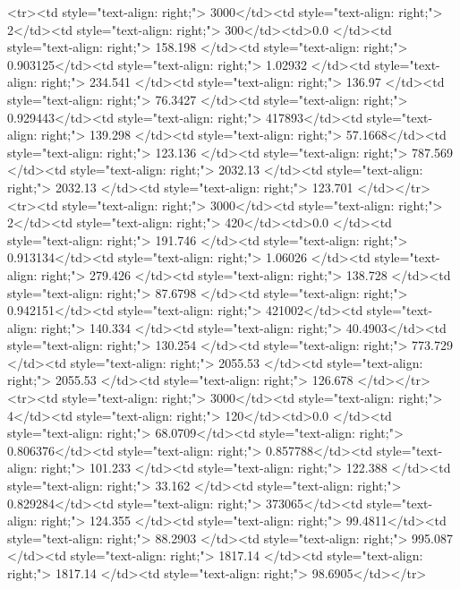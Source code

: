 <tr><td style="text-align: right;">      3000</td><td style="text-align: right;">         2</td><td style="text-align: right;">           300</td><td>0.0          </td><td style="text-align: right;">               158.198 </td><td style="text-align: right;">           0.903125</td><td style="text-align: right;">         1.02932 </td><td style="text-align: right;">        234.541 </td><td style="text-align: right;">           136.97  </td><td style="text-align: right;">              76.3427  </td><td style="text-align: right;">             0.929443</td><td style="text-align: right;">              417893</td><td style="text-align: right;">                      139.298 </td><td style="text-align: right;">            57.1668</td><td style="text-align: right;">               123.136  </td><td style="text-align: right;">       787.569 </td><td style="text-align: right;">   2032.13 </td><td style="text-align: right;">      2032.13 </td><td style="text-align: right;">                123.701 </td></tr>
<tr><td style="text-align: right;">      3000</td><td style="text-align: right;">         2</td><td style="text-align: right;">           420</td><td>0.0          </td><td style="text-align: right;">               191.746 </td><td style="text-align: right;">           0.913134</td><td style="text-align: right;">         1.06026 </td><td style="text-align: right;">        279.426 </td><td style="text-align: right;">           138.728 </td><td style="text-align: right;">              87.6798  </td><td style="text-align: right;">             0.942151</td><td style="text-align: right;">              421002</td><td style="text-align: right;">                      140.334 </td><td style="text-align: right;">            40.4903</td><td style="text-align: right;">               130.254  </td><td style="text-align: right;">       773.729 </td><td style="text-align: right;">   2055.53 </td><td style="text-align: right;">      2055.53 </td><td style="text-align: right;">                126.678 </td></tr>
<tr><td style="text-align: right;">      3000</td><td style="text-align: right;">         4</td><td style="text-align: right;">           120</td><td>0.0          </td><td style="text-align: right;">                68.0709</td><td style="text-align: right;">           0.806376</td><td style="text-align: right;">         0.857788</td><td style="text-align: right;">        101.233 </td><td style="text-align: right;">           122.388 </td><td style="text-align: right;">              33.162   </td><td style="text-align: right;">             0.829284</td><td style="text-align: right;">              373065</td><td style="text-align: right;">                      124.355 </td><td style="text-align: right;">            99.4811</td><td style="text-align: right;">                88.2903 </td><td style="text-align: right;">       995.087 </td><td style="text-align: right;">   1817.14 </td><td style="text-align: right;">      1817.14 </td><td style="text-align: right;">                 98.6905</td></tr>
